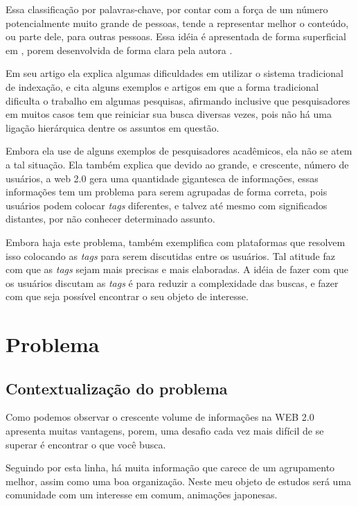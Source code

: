\documentclass[
	12pt,				%
	openright,			%
	twoside,			%
	a4paper,			%
	Times,
	brazil,				%
	]{abntex2}
\begin{document}
Essa classificação por palavras-chave, por contar com a força de um número potencialmente muito grande de pessoas, tende a representar melhor o conteúdo, ou parte dele, para outras pessoas. Essa idéia é apresentada de forma superficial em , porem desenvolvida de forma clara pela autora .
\par
Em seu artigo ela explica algumas dificuldades em utilizar o sistema tradicional de indexação, e cita alguns exemplos e artigos em que a forma tradicional dificulta o trabalho em algumas pesquisas, afirmando inclusive que pesquisadores em muitos casos tem que reiniciar sua busca diversas vezes, pois não há uma ligação hierárquica dentre os assuntos em questão.\cite{tag-2}
\par

Embora ela use de alguns exemplos de pesquisadores acadêmicos, ela não se atem a tal situação. Ela também explica que devido ao grande, e crescente, número de usuários, a web 2.0 gera uma quantidade gigantesca de informações, essas informações tem um problema para serem agrupadas de forma correta, pois usuários podem colocar \textit{tags} diferentes, e talvez até mesmo com significados distantes, por não conhecer determinado assunto.\cite{tag-2}
\par

Embora haja este problema,  também exemplifica com plataformas que resolvem isso colocando as \textit{tags} para serem discutidas entre os usuários. Tal atitude faz com que as \textit{tags} sejam mais precisas e mais elaboradas. A idéia de fazer com que os usuários discutam as \textit{tags} é para reduzir a complexidade das buscas, e fazer com que seja possível encontrar o seu objeto de interesse.\cite{tag-2}
\par

\chapter{Problema}
\section{Contextualização do problema}
Como podemos observar o crescente volume de informações na WEB 2.0 apresenta muitas vantagens, porem, uma desafio cada vez mais difícil de se superar é encontrar o que você busca.
\par

Seguindo por esta linha, há muita informação que carece de um agrupamento melhor, assim como uma boa organização. Neste meu objeto de estudos será uma comunidade com um interesse em comum, animações japonesas.
\par
\end{document}
